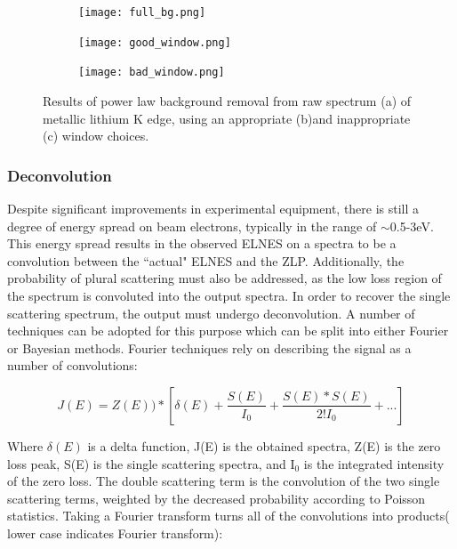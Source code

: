 \begin{figure}[H]
	\centering
	\begin{subfigure}{0.45\textwidth}
		\texttt{[image: full\_bg.png]} 
		\caption{}
		\label{full_bg}
	\end{subfigure}
	\hspace{-0.01cm}
	
	\begin{subfigure}{0.45\textwidth}
		\texttt{[image: good\_window.png]} 
		\caption{}
		\label{good_window}
	\end{subfigure}
	\begin{subfigure}{0.45\textwidth}
		\texttt{[image: bad\_window.png]} 
		\caption{}
		\label{bad_window}
	\end{subfigure}
	\caption{Results of power law background removal from raw spectrum (a) of metallic lithium K edge, using an appropriate (b)and inappropriate (c) window choices.}
	\label{bg_removal}
\end{figure}

\subsubsection{Deconvolution} \label{deconvolution}
Despite significant improvements in experimental equipment, there is still a degree of energy spread on beam electrons, typically in the range of $\sim$0.5-3eV.  This energy spread results in the observed ELNES on a spectra to be a convolution between the ``actual" ELNES and the ZLP.  Additionally, the probability of plural scattering must also be addressed, as the low loss region of the spectrum is convoluted into the output spectra.  In order to recover the single scattering spectrum, the output must undergo deconvolution.  A number of techniques can be adopted for this purpose which can be split into either Fourier or Bayesian methods.   Fourier techniques rely on describing the signal as a number of convolutions:

\begin{equation}
 	J(E) = Z(E))\ast[\delta(E) + \frac{S(E)}{I_0} +  \frac{S(E) \ast S(E)}{2! I_0}   + ...]
\end{equation}



Where $\delta(E)$ is a delta function,  J(E) is the obtained spectra, Z(E) is the zero loss peak, S(E) is the single scattering spectra, and I$_0$ is the integrated intensity of the zero loss.  The double scattering term is the convolution of the two single scattering terms, weighted by the decreased probability according to Poisson statistics.   Taking a Fourier transform turns all of the convolutions into products( lower case indicates Fourier transform): 

